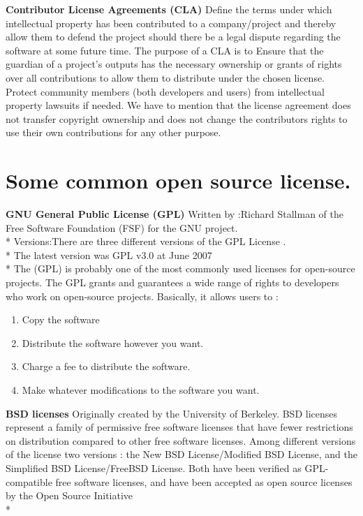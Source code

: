 \documentclass[11pt]{article} %
\begin{document}
{\bf Contributor License Agreements (CLA)}
Define the terms under which intellectual property has been contributed to a company/project and thereby allow them to defend the project should there be a legal dispute regarding the software at some future time. 
The purpose of a CLA is to
 Ensure that the guardian of a project's outputs has the necessary ownership or grants of rights over all contributions to allow them to distribute under the chosen license.
Protect community members (both developers and users) from intellectual property lawsuits if needed.
We have to mention that the license agreement does not transfer copyright ownership and does not change the contributors rights to use their own contributions for any other purpose.
\section{Some common open source license.}

{\bf GNU General Public License (GPL)}
Written by :Richard Stallman of the Free Software Foundation (FSF) for the GNU project.
\\* 
Versions:There are three different versions of the GPL License .\\* 
The latest version was GPL v3.0 at June 2007\\* 
The (GPL) is probably one of the most commonly used licenses for open-source projects. The GPL grants and guarantees a wide range of rights to developers who work on open-source projects. Basically, it allows users to :
\begin{enumerate}
\item Copy the software
\item Distribute the software however you want.
\item Charge a fee to distribute the software.
\item Make whatever modifications to the software you want.
\end{enumerate}
 
{\bf BSD licenses}
 Originally created by the University of Berkeley. BSD licenses represent a family of permissive free software licenses that have fewer restrictions on distribution compared to other free software licenses.
 Among different versions of the license two versions : the New BSD License/Modified BSD License, and the Simplified BSD License/FreeBSD License. Both have been verified as GPL-compatible free software licenses, and have been accepted as open source licenses by the Open Source Initiative \\* 
\end{document}
